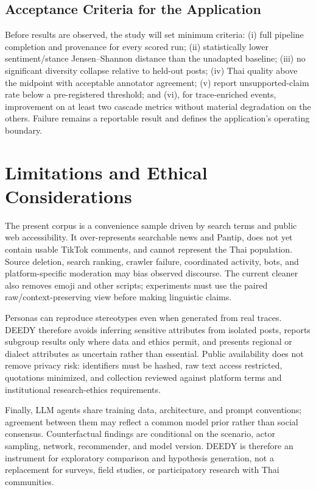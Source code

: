 \documentclass[conference]{IEEEtran}
\begin{document}
\subsection{Acceptance Criteria for the Application}

Before results are observed, the study will set minimum criteria: (i) full
pipeline completion and provenance for every scored run; (ii) statistically
lower sentiment/stance Jensen--Shannon distance than the unadapted baseline;
(iii) no significant diversity collapse relative to held-out posts; (iv) Thai
quality above the midpoint with acceptable annotator agreement; (v) report
unsupported-claim rate below a pre-registered threshold; and (vi), for
trace-enriched events, improvement on at least two cascade metrics without
material degradation on the others. Failure remains a reportable result and
defines the application's operating boundary.

\section{Limitations and Ethical Considerations}

The present corpus is a convenience sample driven by search terms and public
web accessibility. It over-represents searchable news and Pantip, does not yet
contain usable TikTok comments, and cannot represent the Thai population.
Source deletion, search ranking, crawler failure, coordinated activity, bots,
and platform-specific moderation may bias observed discourse. The current
cleaner also removes emoji and other scripts; experiments must use the paired
raw/context-preserving view before making linguistic claims.

Personas can reproduce stereotypes even when generated from real traces.
DEEDY therefore avoids inferring sensitive attributes from isolated posts,
reports subgroup results only where data and ethics permit, and presents
regional or dialect attributes as uncertain rather than essential. Public
availability does not remove privacy risk: identifiers must be hashed, raw
text access restricted, quotations minimized, and collection reviewed against
platform terms and institutional research-ethics requirements.

Finally, LLM agents share training data, architecture, and prompt conventions;
agreement between them may reflect a common model prior rather than social
consensus. Counterfactual findings are conditional on the scenario, actor
sampling, network, recommender, and model version. DEEDY is therefore an
instrument for exploratory comparison and hypothesis generation, not a
replacement for surveys, field studies, or participatory research with Thai
communities.
\end{document}
